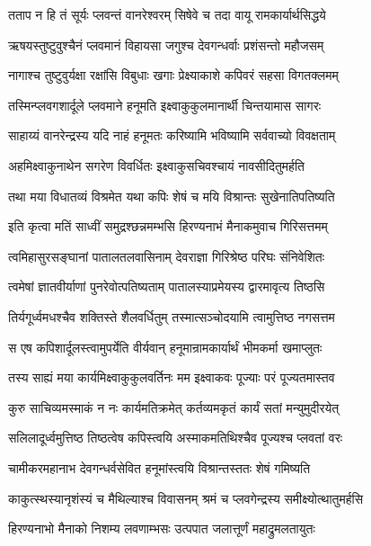 \twolineshloka
{तताप न हि तं सूर्यः प्लवन्तं वानरेश्वरम्}
{सिषेवे च तदा वायू रामकार्यार्थसिद्धये} %

\twolineshloka
{ऋषयस्तुष्टुवुश्चैनं प्लवमानं विहायसा}
{जगुश्च देवगन्धर्वाः प्रशंसन्तो महौजसम्} %

\twolineshloka
{नागाश्च तुष्टुवुर्यक्षा रक्षांसि विबुधाः खगाः}
{प्रेक्ष्याकाशे कपिवरं सहसा विगतक्लमम्} %

\twolineshloka
{तस्मिन्प्लवगशार्दूले प्लवमाने हनूमति}
{इक्ष्वाकुकुलमानार्थी चिन्तयामास सागरः} %

\twolineshloka
{साहाय्यं वानरेन्द्रस्य यदि नाहं हनूमतः}
{करिष्यामि भविष्यामि सर्ववाच्यो विवक्षताम्} %

\twolineshloka
{अहमिक्ष्वाकुनाथेन सगरेण विवर्धितः}
{इक्ष्वाकुसचिवश्चायं नावसीदितुमर्हति} %

\twolineshloka
{तथा मया विधातव्यं विश्रमेत यथा कपिः}
{शेषं च मयि विश्रान्तः सुखेनातिपतिष्यति} %

\twolineshloka
{इति कृत्वा मतिं साध्वीं समुद्रश्छन्नमम्भसि}
{हिरण्यनाभं मैनाकमुवाच गिरिसत्तमम्} %

\twolineshloka
{त्वमिहासुरसङ्घानां पातालतलवासिनाम्}
{देवराज्ञा गिरिश्रेष्ठ परिघः संनिवेशितः} %

\twolineshloka
{त्वमेषां ज्ञातवीर्याणां पुनरेवोत्पतिष्यताम्}
{पातालस्याप्रमेयस्य द्वारमावृत्य तिष्ठसि} %

\twolineshloka
{तिर्यगूर्ध्वमधश्चैव शक्तिस्ते शैलवर्धितुम्}
{तस्मात्सञ्चोदयामि त्वामुत्तिष्ठ नगसत्तम} %

\twolineshloka
{स एष कपिशार्दूलस्त्वामुपर्येति वीर्यवान्}
{हनूमान्रामकार्यार्थं भीमकर्मा खमाप्लुतः} %

\twolineshloka
{तस्य साह्यं मया कार्यमिक्ष्वाकुकुलवर्तिनः}
{मम इक्ष्वाकवः पूज्याः परं पूज्यतमास्तव} %

\twolineshloka
{कुरु साचिव्यमस्माकं न नः कार्यमतिक्रमेत्}
{कर्तव्यमकृतं कार्यं सतां मन्युमुदीरयेत्} %

\twolineshloka
{सलिलादूर्ध्वमुत्तिष्ठ तिष्ठत्वेष कपिस्त्वयि}
{अस्माकमतिथिश्चैव पूज्यश्च प्लवतां वरः} %

\twolineshloka
{चामीकरमहानाभ देवगन्धर्वसेवित}
{हनूमांस्त्वयि विश्रान्तस्ततः शेषं गमिष्यति} %

\twolineshloka
{काकुत्स्थस्यानृशंस्यं च मैथिल्याश्च विवासनम्}
{श्रमं च प्लवगेन्द्रस्य समीक्ष्योत्थातुमर्हसि} %

\twolineshloka
{हिरण्यनाभो मैनाको निशम्य लवणाम्भसः}
{उत्पपात जलात्तूर्णं महाद्रुमलतायुतः} %

